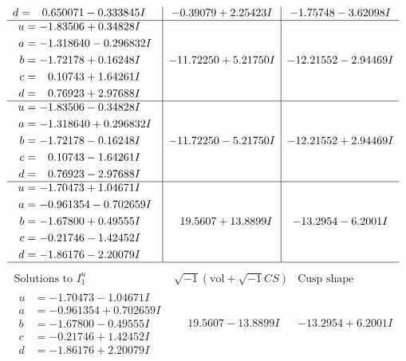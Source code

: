 \documentclass[1p]{elsarticle_modified}
\theoremstyle{definition}
\newcommand{\I}{\sqrt{-1}}
\begin{document}
$$\begin{array}{c|c|c}
\begin{aligned}
d &= \phantom{-}0.650071 - 0.333845 I\end{aligned}
 & -0.39079 + 2.25423 I & -1.75748 - 3.62098 I \\ \hline\begin{aligned}
u &= -1.83506 + 0.34828 I \\
a &= -1.318640 - 0.296832 I \\
b &= -1.72178 + 0.16248 I \\
c &= \phantom{-}0.10743 + 1.64261 I \\
d &= \phantom{-}0.76923 + 2.97688 I\end{aligned}
 & -11.72250 + 5.21750 I & -12.21552 - 2.94469 I \\ \hline\begin{aligned}
u &= -1.83506 - 0.34828 I \\
a &= -1.318640 + 0.296832 I \\
b &= -1.72178 - 0.16248 I \\
c &= \phantom{-}0.10743 - 1.64261 I \\
d &= \phantom{-}0.76923 - 2.97688 I\end{aligned}
 & -11.72250 - 5.21750 I & -12.21552 + 2.94469 I \\ \hline\begin{aligned}
u &= -1.70473 + 1.04671 I \\
a &= -0.961354 - 0.702659 I \\
b &= -1.67800 + 0.49555 I \\
c &= -0.21746 - 1.42452 I \\
d &= -1.86176 - 2.20079 I\end{aligned}
 & \phantom{-}19.5607 + 13.8899 I & -13.2954 - 6.2001 I\\
 \hline 
 \end{array}$$\newpage$$\begin{array}{c|c|c}  
\text{Solutions to }I^u_{1}& \I (\text{vol} + \sqrt{-1}CS) & \text{Cusp shape}\\
 \hline 
\begin{aligned}
u &= -1.70473 - 1.04671 I \\
a &= -0.961354 + 0.702659 I \\
b &= -1.67800 - 0.49555 I \\
c &= -0.21746 + 1.42452 I \\
d &= -1.86176 + 2.20079 I\end{aligned}
 & \phantom{-}19.5607 - 13.8899 I & -13.2954 + 6.2001 I \\ \hline\begin{aligned}

\end{aligned}
\end{array}$$
\end{document}
